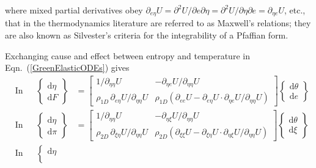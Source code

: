 where mixed partial derivatives obey $\partial_{e \eta} U = \partial^2 U / \partial e \partial \eta = \partial^2 U / \partial \eta \partial e = \partial_{\eta e} U$, etc., that in the thermo\-dynamics literature are referred to as Maxwell's relations; they are also known as Silvester's criteria for the integrability of a Pfaffian form.

Exchanging cause and effect between entropy and temperature in Eqn.~(\ref{GreenElasticODEs}) gives
\small
\begin{subequations}
    \label{HelmholtzElasticODEs}
    \begin{align}
    \mbox{} & \text{In 1D:} &
    \left\{ \begin{matrix} \mathrm{d} \eta \\ 
    \mathrm{d} F \end{matrix} \right\} & = \begin{bmatrix}
    1/\partial_{\eta\eta} U & -\partial_{\eta e} U / 
    \partial_{\eta\eta} U \\
    \rho_{1D} \, \partial_{e\eta} U / \partial_{\eta\eta} U & \rho_{1D} ( \partial_{ee} U - \partial_{e\eta} U \!\cdot\! \partial_{\eta e} U / \partial_{\eta\eta} U ) \end{bmatrix} 
    \left\{ \begin{matrix} \mathrm{d} \theta \\
    \mathrm{d} e \end{matrix} \right\} \\
    \mbox{} & \text{In 2D:} &
    \left\{ \begin{matrix} \mathrm{d} \eta \\ 
    \mathrm{d} \pi \end{matrix} \right\} & = \begin{bmatrix}
    1/\partial_{\eta\eta} U & -\partial_{\eta \xi} U / \partial_{\eta\eta} U \\
    \rho_{2D} \, \partial_{\xi\eta} U / \partial_{\eta\eta} U & \rho_{2D} ( \partial_{\xi\xi} U - \partial_{\xi\eta} U \!\cdot\! \partial_{\eta \xi} U / \partial_{\eta\eta} U ) \end{bmatrix} \left\{ \begin{matrix} \mathrm{d} \theta \\
    \mathrm{d} \xi \end{matrix} \right\} \label{HelmholtzMembrane} \\
    \mbox{} & \text{In 3D:} &
    \left\{ \begin{matrix} \mathrm{d} \eta \\ 

\end{matrix}
\end{align}
\end{subequations}
